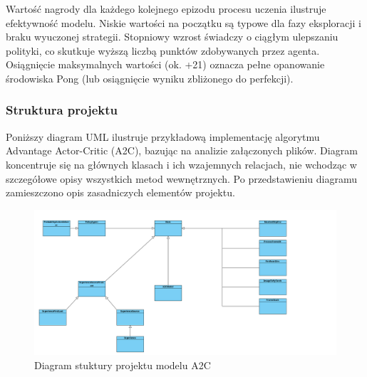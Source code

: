 \documentclass[a4paper, 12pt]{article}
\numberwithin{equation}{section}
\begin{document}
    Wartość nagrody dla każdego kolejnego epizodu procesu uczenia ilustruje efektywność modelu.
    Niskie wartości na początku są typowe dla fazy eksploracji i braku wyuczonej strategii. Stopniowy wzrost świadczy o ciągłym ulepszaniu polityki, co skutkuje wyższą liczbą punktów zdobywanych przez agenta.
    Osiągnięcie maksymalnych wartości (ok. +21) oznacza pełne opanowanie środowiska Pong (lub osiągnięcie wyniku zbliżonego do perfekcji).
    \subsubsection{Struktura projektu}
    Poniższy diagram UML ilustruje przykładową implementację algorytmu Advantage Actor-Critic (A2C), bazując na analizie załączonych plików. Diagram koncentruje się na głównych klasach i ich wzajemnych relacjach, nie wchodząc w szczegółowe opisy wszystkich metod wewnętrznych. Po przedstawieniu diagramu zamieszczono opis zasadniczych elementów projektu.
    \begin{figure}[H]
        \centering
        \includegraphics[width=\textwidth]{pictures/A2C_diagram.png}
        \caption{Diagram stuktury projektu modelu A2C}
    \end{figure}
\end{document}
